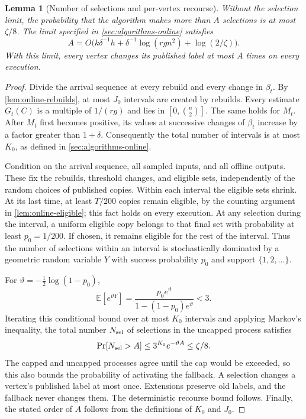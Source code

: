 \documentclass[11pt]{article}
\newtheorem{lemma}[theorem]{Lemma}
\begin{document}
\begin{lemma}[Number of selections and per-vertex recourse]
\label{lem:online-recourse}
Without the selection limit, the probability that the algorithm makes
more than $A$ selections is at most $\zeta/8$. The limit specified in
\cref{sec:algorithms-online} satisfies
\[
 A=O\bigl(k\delta^{-1}h+
          \delta^{-1}\log(rgn^2)+\log(2/\zeta)\bigr).
\]
With this limit, every vertex changes its published label at most $A$
times on every execution.
\end{lemma}
\begin{proof}
Divide the arrival sequence at every rebuild and every change in
$\beta_t$. By \cref{lem:online-rebuilds}, at most $J_0$ intervals
are created by rebuilds. Every estimate $G_t(C)$ is a multiple of
$1/(rg)$ and lies in $[0,\binom n2]$. The same holds for $M_t$.
After $M_t$ first becomes positive, its values at successive changes
of $\beta_t$ increase by a factor greater than $1+\delta$.
Consequently the total number of intervals is at most $K_0$, as
defined in \cref{sec:algorithms-online}.

Condition on the arrival sequence, all sampled inputs, and all offline
outputs. These fix the rebuilds, threshold changes, and eligible
sets, independently of the random choices of published copies.
Within each interval the eligible sets shrink. At its last time,
at least $T/200$ copies remain eligible, by the counting argument in
\cref{lem:online-eligible}; this fact holds on every execution.
At any selection during the interval, a uniform eligible copy belongs
to that final set with probability at least $p_0=1/200$. If chosen,
it remains eligible for the rest of the interval. Thus the number of
selections within an interval is stochastically dominated by a
geometric random variable $Y$ with success probability $p_0$ and
support $\{1,2,\ldots\}$.

For $\vartheta=-\tfrac12\log(1-p_0)$,
\[
 \mathbb E[e^{\vartheta Y}]
 =\frac{p_0e^\vartheta}{1-(1-p_0)e^\vartheta}<3.
\]
Iterating this conditional bound over at most $K_0$ intervals and
applying Markov's inequality, the total number $N_{\rm sel}$ of
selections in the uncapped process satisfies
\[
 \Pr[N_{\rm sel}>A]
 \le 3^{K_0}e^{-\vartheta A}\le\zeta/8.
\]
The capped and uncapped processes agree until the cap would be
exceeded, so this also bounds the probability of activating the
fallback. A selection changes a vertex's published label at most
once. Extensions preserve old labels, and the fallback never changes
them. The deterministic recourse bound follows. Finally, the stated
order of $A$ follows from the definitions of $K_0$ and $J_0$.
\end{proof}
\end{document}
